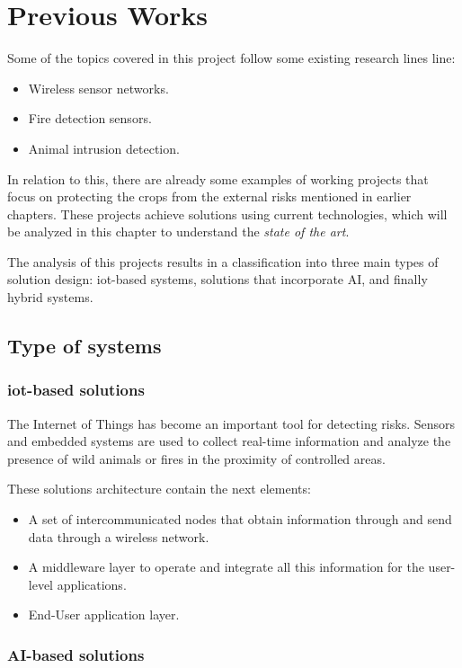 \section{Previous Works}

Some of the topics covered in this project follow some existing research lines line:
\begin{itemize}
    \item Wireless sensor networks.
    \item Fire detection sensors.
    \item Animal intrusion detection.
\end{itemize}

In relation to this, there are already some examples of working projects that focus on 
protecting the crops from the external risks mentioned in earlier chapters. These projects achieve solutions 
using current technologies, which will be analyzed in this chapter to understand the \textit{state of the art}. 

The analysis of this projects results in a classification into three main types of solution design: \acrshort{iot}-based systems, 
solutions that incorporate AI, and finally hybrid systems.

\subsection{Type of systems}
\subsubsection*{\acrshort{iot}-based solutions}

The Internet of Things has become an important tool for detecting risks. Sensors and embedded systems are used 
to collect real-time information and analyze the presence of wild animals or fires in the proximity of controlled areas.

These solutions architecture contain the next elements:
\begin{itemize}
    \item A set of intercommunicated nodes that obtain information through and send data through a wireless network.
    \item A middleware layer to operate and integrate all this information for the user-level applications.
    \item End-User application layer.
\end{itemize}

\subsubsection*{AI-based solutions}

